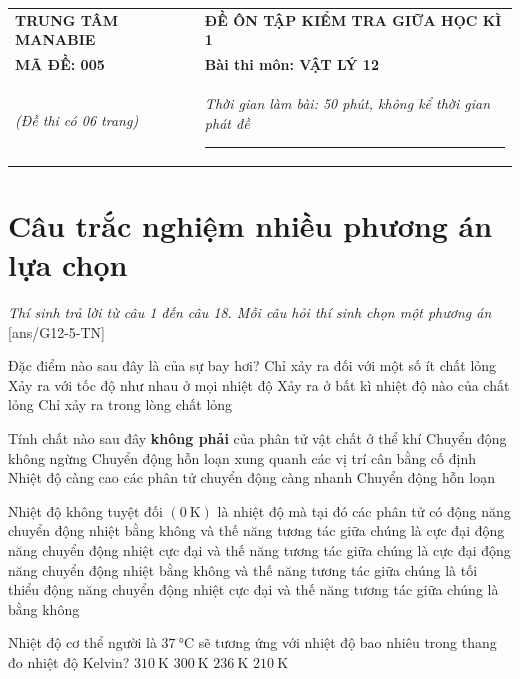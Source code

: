 \begin{tabular}{M{6.5cm}M{11cm}}
	\textbf{TRUNG TÂM MANABIE}& \textbf{ĐỀ ÔN TẬP KIỂM TRA GIỮA HỌC KÌ 1}\\
	\textbf{MÃ ĐỀ: 005}& \textbf{Bài thi môn: VẬT LÝ 12}\\
	\textit{(Đề thi có 06 trang)}& \textit{Thời gian làm bài: 50 phút, không kể thời gian phát đề}
	
	\noindent\rule{4cm}{0.8pt} \\
\end{tabular}
\setcounter{section}{0}
\section{Câu trắc nghiệm nhiều phương án lựa chọn}
\textit{Thí sinh trả lời từ câu 1 đến câu 18. Mỗi câu hỏi thí sinh chọn một phương án}
\setcounter{ex}{0}
[ans/G12-5-TN]
\begin{ex}
Đặc điểm nào sau đây là của sự bay hơi?	
	\choice
	{Chỉ xảy ra đối với một số ít chất lỏng}
	{Xảy ra với tốc độ như nhau ở mọi nhiệt độ}
	{\True Xảy ra ở bất kì nhiệt độ nào của chất lỏng}
	{Chỉ xảy ra trong lòng chất lỏng}
	\loigiai{}
\end{ex}
\begin{ex}
	Tính chất nào sau đây \textbf{không phải} của phân tử vật chất ở thể khí
	\choice
	{Chuyển động không ngừng}
	{\True Chuyển động hỗn loạn xung quanh các vị trí cân bằng cố định}
	{Nhiệt độ càng cao các phân tử chuyển động càng nhanh}
	{Chuyển động hỗn loạn}
	\loigiai{}
\end{ex}
\begin{ex}
Nhiệt độ không tuyệt đối $\left(\SI{0}{\kelvin}\right)$ là nhiệt độ mà tại đó các phân tử có	
	\choice
	{động năng chuyển động nhiệt bằng không và thế năng tương tác giữa chúng là cực đại}
	{động năng chuyển động nhiệt cực đại và thế năng tương tác giữa chúng là cực đại}
	{\True động năng chuyển động nhiệt bằng không và thế năng tương tác giữa chúng là tối thiểu}
	{động năng chuyển động nhiệt cực đại và thế năng tương tác giữa chúng là bằng không}
	\loigiai{}
\end{ex}
\begin{ex}
	Nhiệt độ cơ thể người là $\SI{37}{\celsius}$ sẽ tương ứng với nhiệt độ bao nhiêu trong thang đo nhiệt độ Kelvin?
	\choice
	{\True $\SI{310}{\kelvin}$}
	{$\SI{300}{\kelvin}$}
	{$\SI{236}{\kelvin}$}
	{$\SI{210}{\kelvin}$}
	\loigiai{}
\end{ex}
